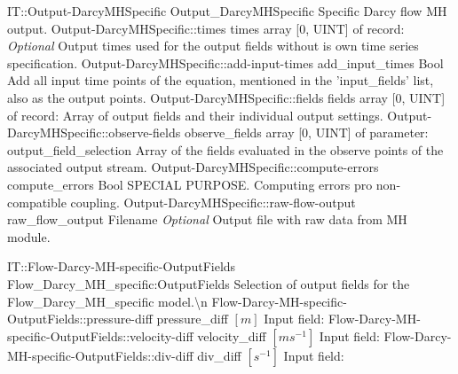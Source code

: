 \begin{RecordType}
	{IT::Output-DarcyMHSpecific}
	{Output{\_}DarcyMHSpecific}
	{}%
	{}%
	{{{Specific Darcy flow MH output.}%
}}
		\RecKey
			{Output-DarcyMHSpecific::times}
			{times}
			{{array [0, UINT] of }{record: }}{}
			{ \it{Optional}}
			{{{Output times used for the output fields without is own time series specification.}%
}}
		\RecKey
			{Output-DarcyMHSpecific::add-input-times}
			{add{\_}input{\_}times}
			{{Bool}}{}
			{ }
			{{{Add all input time points of the equation, mentioned in the 'input{\_}fields' list, also as the output points.}%
}}
		\RecKey
			{Output-DarcyMHSpecific::fields}
			{fields}
			{{array [0, UINT] of }{record: }}{}
			{ \ValueDefault{[]}}
			{{{Array of output fields and their individual output settings.}%
}}
		\RecKey
			{Output-DarcyMHSpecific::observe-fields}
			{observe{\_}fields}
			{{array [0, UINT] of }{parameter: output{\_}field{\_}selection}}{}
			{ \ValueDefault{[]}}
			{{{Array of the fields evaluated in the observe points of the associated output stream.}%
}}
		\RecKey
			{Output-DarcyMHSpecific::compute-errors}
			{compute{\_}errors}
			{{Bool}}{}
			{ }
			{{{SPECIAL PURPOSE. Computing errors pro non-compatible coupling.}%
}}
		\RecKey
			{Output-DarcyMHSpecific::raw-flow-output}
			{raw{\_}flow{\_}output}
			{{Filename}}{}
			{ \it{Optional}}
			{{{Output file with raw data from MH module.}%
}}
\end{RecordType}
\begin{SelectionType}
	{IT::Flow-Darcy-MH-specific-OutputFields}
	{Flow{\_}Darcy{\_}MH{\_}specific:OutputFields}
	{{{Selection of output fields for the Flow{\_}Darcy{\_}MH{\_}specific model.{\textbackslash}n}%
}}
		\SelectionItem
			{Flow-Darcy-MH-specific-OutputFields::pressure-diff}
			{pressure{\_}diff}
			{{{}{$[m]$}{ Input field: }%
}}
		\SelectionItem
			{Flow-Darcy-MH-specific-OutputFields::velocity-diff}
			{velocity{\_}diff}
			{{{}{$[ms^{-1}]$}{ Input field: }%
}}
		\SelectionItem
			{Flow-Darcy-MH-specific-OutputFields::div-diff}
			{div{\_}diff}
			{{{}{$[s^{-1}]$}{ Input field: }%
}}
\end{SelectionType}
